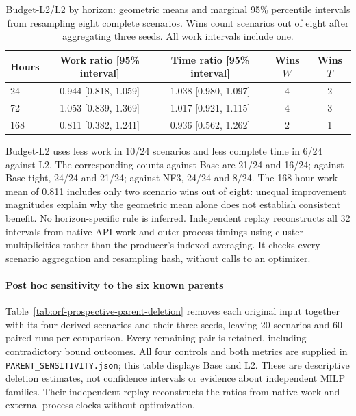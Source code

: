 \begin{table}[htbp]
\centering\small\setlength{\tabcolsep}{4pt}
\caption{Budget-L2/L2 by horizon: geometric means and marginal 95\% percentile
intervals from resampling eight complete scenarios. Wins count scenarios out
of eight after aggregating three seeds. All work intervals include one.}
\label{tab:orf-prospective-clusters}
\begin{tabular}{lcccc}\toprule
Hours & Work ratio [95\% interval] & Time ratio [95\% interval] & Wins $W$ & Wins $T$\\\midrule
24 & 0.944 [0.818, 1.059] & 1.038 [0.980, 1.097] & 4 & 2\\
72 & 1.053 [0.839, 1.369] & 1.017 [0.921, 1.115] & 4 & 3\\
168 & 0.811 [0.382, 1.241] & 0.936 [0.562, 1.262] & 2 & 1\\
\bottomrule\end{tabular}\end{table}
Budget-L2 uses less work in 10/24 scenarios and less complete time in 6/24
against L2. The corresponding counts against Base are 21/24 and 16/24;
against Base-tight, 24/24 and 21/24; against NF3, 24/24 and 8/24.
The 168-hour work mean of 0.811 includes only two scenario wins out of eight:
unequal improvement magnitudes explain why the geometric mean alone does not
establish consistent benefit. No horizon-specific rule is inferred.
Independent replay reconstructs all 32 intervals from native API work and
outer process timings using cluster multiplicities rather than the producer's
indexed averaging. It checks every scenario aggregation and resampling hash,
without calls to an optimizer.

\paragraph{Post hoc sensitivity to the six known parents}
Table~\ref{tab:orf-prospective-parent-deletion} removes each original input
together with its four derived scenarios and their three seeds, leaving 20
scenarios and 60 paired runs per comparison. Every remaining pair is retained,
including contradictory bound outcomes. All four controls and both metrics
are supplied in \texttt{PARENT\_SENSITIVITY.json}; this table displays Base and
L2. These are descriptive deletion estimates, not confidence intervals or
evidence about independent MILP families. Their independent replay reconstructs
the ratios from native work and external process clocks without optimization.


